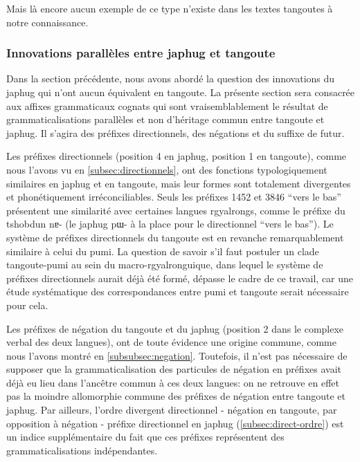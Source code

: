 \documentclass[oldfontcommands,twoside,a4paper,11pt,draft]{memoir}
\newcommand{\ipa}[1]{{\phon #1}} %
\newcommand{\tgz}[1]{#1 \mo{#1} \tg{#1}}
\begin{document}
Mais là encore aucun exemple de ce type n'existe dans les textes tangoutes à notre connaissance. 

 
\subsubsection{Innovations parallèles entre japhug et tangoute} \label{subsubsec:innovations.paralleles}
Dans la section précédente, nous avons abordé la question des innovations du japhug qui n'ont aucun équivalent en tangoute. La présente section sera consacrée aux affixes grammaticaux cognats qui sont vraisemblablement le résultat de grammaticalisations parallèles et non d'héritage commun entre tangoute et japhug. Il s'agira des préfixes directionnels, des négations et du suffixe de futur.

Les préfixes directionnels (position 4 en japhug, position 1 en tangoute), comme nous l'avons vu en \ref{subsec:directionnels}, ont des fonctions typologiquement similaires en japhug et en tangoute, mais leur formes sont totalement divergentes et phonétiquement irréconciliables. Seuls les préfixes \tgz{1452}  et \tgz{3846} ``vers le bas'' présentent une similarité avec certaines langues rgyalrongs, comme le préfixe du tshobdun \ipa{nɐ-} (le japhug \ipa{pɯ-} à la place pour le directionnel ``vers le bas''). Le système de préfixes directionnels du tangoute est en revanche remarquablement similaire à celui du pumi. La question de savoir s'il faut postuler un clade tangoute-pumi au sein du macro-rgyalronguique, dans lequel le système de préfixes directionnels aurait déjà été formé, dépasse le cadre de ce travail, car une étude systématique des correspondances entre pumi et tangoute serait nécessaire pour cela.

Les préfixes de négation du tangoute et du japhug  (position 2 dans le complexe verbal des deux langues),  ont de toute évidence une origine commune, comme nous l'avons montré en \ref{subsubsec:negation}. Toutefois,  il n'est pas nécessaire de supposer que la grammaticalisation des particules de négation en préfixes avait déjà eu lieu dans l'ancêtre commun à ces deux langues: on ne retrouve en effet pas la moindre allomorphie commune des préfixes de négation entre tangoute et japhug. Par ailleurs, l'ordre divergent directionnel - négation en tangoute, par opposition à négation - préfixe directionnel en japhug (\ref{subsec:direct-ordre}) est un indice supplémentaire du fait que ces préfixes représentent des grammaticalisations indépendantes.
\end{document}
